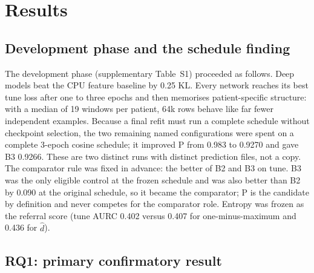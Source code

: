 \documentclass[sigconf,anonymous]{acmart}
\begin{document}
\section{Results}
\subsection{Development phase and the schedule finding}
\label{sec:dev}

The development phase (supplementary Table~S1) proceeded as follows. Deep models beat the CPU feature baseline by 0.25 KL. Every network reaches its best tune loss after one to three epochs and then memorises patient-specific structure: with a median of 19 windows per patient, 64k rows behave like far fewer independent examples. Because a final refit must run a complete schedule without checkpoint selection, the two remaining named configurations were spent on a complete 3-epoch cosine schedule; it improved P from 0.983 to 0.9270 and gave B3 0.9266. These are two distinct runs with distinct prediction files, not a copy. The comparator rule was fixed in advance: the better of B2 and B3 on tune. B3 was the only eligible control at the frozen schedule and was also better than B2 by 0.090 at the original schedule, so it became the comparator; P is the candidate by definition and never competes for the comparator role. Entropy was frozen as the referral score (tune AURC 0.402 versus 0.407 for one-minus-maximum and 0.436 for $\hat d$).


\subsection{RQ1: primary confirmatory result}
\end{document}
